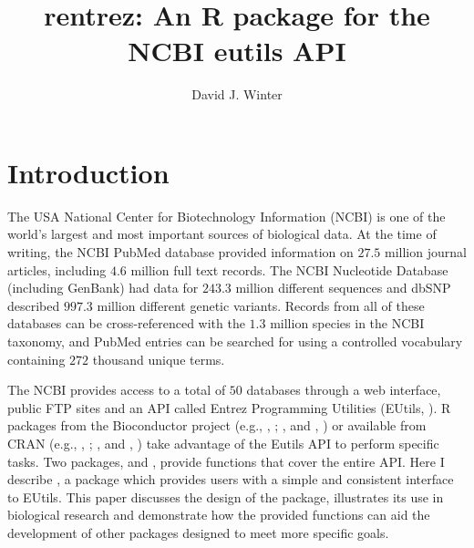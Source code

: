 \title{rentrez: An R package for the NCBI eutils API}
\author{David J. Winter}

\maketitle


\section{Introduction}

The USA National Center for Biotechnology Information (NCBI) is one of the world's 
largest and most important sources of biological data. At the time of writing, the NCBI
PubMed database provided information on $27.5$ million journal
articles, including $4.6$ million full text records. The NCBI
Nucleotide Database (including GenBank) had data for $243.3$ million different sequences and dbSNP described $997.3$ 
million different genetic variants. Records from all of these databases can be 
cross-referenced with the $1.3$ million species in the NCBI taxonomy, and PubMed entries can be searched for using a 
controlled vocabulary containing $272$ thousand unique terms. 

The NCBI provides access to a total of $50$ databases 
through a web interface, public FTP sites and an API called Entrez Programming
Utilities (EUtils, \citealt{sayers_EUtils}). R packages from the Bioconductor 
project (e.g., , \citealt{genomes}; , 
\citealt{RMassBank} and , \citealt{MeSHSim}) or available from 
CRAN (e.g., , \citealt{APE}; , \citealt{RISmed} and
, \citealt{miner}) take advantage of the Eutils API to 
perform specific tasks. Two packages,  and  
\citep{reutils}, provide functions that cover the entire API.  Here I describe 
, a package which provides users with a simple and consistent 
interface to EUtils. This paper discusses the design of the package, illustrates 
its use in biological research and demonstrate how the provided functions can 
aid the development of other packages designed to meet more specific goals.


